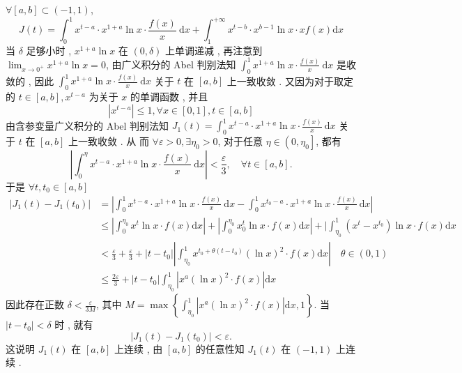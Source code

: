\documentclass[10pt]{article}
\begin{document}
$\forall[a, b] \subset(-1,1)$,
$$
J(t)=\int_{0}^{1} x^{t-a} \cdot x^{1+a} \ln x \cdot \frac{f(x)}{x} \mathrm{~d} x+\int_{1}^{+\infty} x^{t-b} \cdot x^{b-1} \ln x \cdot x f(x) \mathrm{d} x
$$
 当  $\delta$  足够小时 , $x^{1+a} \ln x$  在  $(0, \delta)$  上单调递减 ,  再注意到  $\lim _{x \rightarrow 0^{+}} x^{1+a} \ln x=0$,  由广义积分的  Abel  判别法知  $\int_{0}^{1} x^{1+a} \ln x \cdot \frac{f(x)}{x} \mathrm{~d} x$  是收敛的 ,  因此  $\int_{0}^{1} x^{1+a} \ln x \cdot \frac{f(x)}{x} \mathrm{~d} x$  关于  $t$  在  $[a, b]$  上一致收敛 .  又因为对于取定   的  $t \in[a, b], x^{t-a}$  为关于  $x$  的单调函数 ,  并且 
$$
\left|x^{t-a}\right| \leqslant 1, \forall x \in[0,1], t \in[a, b]
$$
 由含参变量广义积分的  Abel  判别法知  $J_{1}(t)=\int_{0}^{1} x^{t-a} \cdot x^{1+a} \ln x \cdot \frac{f(x)}{x} \mathrm{~d} x$  关于  $t$  在  $[a, b]$  上一致收敛 .  从   而  $\forall \varepsilon>0, \exists \eta_{0}>0$,  对于任意  $\eta \in\left(0, \eta_{0}\right]$,  都有 
$$
\left|\int_{0}^{\eta} x^{t-a} \cdot x^{1+a} \ln x \cdot \frac{f(x)}{x} \mathrm{~d} x\right|<\frac{\varepsilon}{3}, \quad \forall t \in[a, b] .
$$
 于是  $\forall t, t_{0} \in[a, b]$
$$
\begin{aligned}
\left|J_{1}(t)-J_{1}\left(t_{0}\right)\right| &=\left|\int_{0}^{1} x^{t-a} \cdot x^{1+a} \ln x \cdot \frac{f(x)}{x} \mathrm{~d} x-\int_{0}^{1} x^{t_{0}-a} \cdot x^{1+a} \ln x \cdot \frac{f(x)}{x} \mathrm{~d} x\right| \\
& \leqslant\left|\int_{0}^{\eta_{0}} x^{t} \ln x \cdot f(x) \mathrm{d} x\right|+\left|\int_{0}^{\eta_{0}} x_{0}^{t} \ln x \cdot f(x) \mathrm{d} x\right|+\mid \int_{\eta_{0}}^{1}\left(x^{t}-x^{t_{0}}\right) \ln x \cdot f(x) \mathrm{d} x \\
&<\frac{\varepsilon}{3}+\frac{\varepsilon}{3}+\left|t-t_{0}\right|\left|\int_{\eta_{0}}^{1} x^{t_{0}+\theta\left(t-t_{0}\right)}(\ln x)^{2} \cdot f(x) \mathrm{d} x\right| \quad \theta \in(0,1) \\
& \leqslant \frac{2 \varepsilon}{3}+\left|t-t_{0}\right| \int_{\eta_{0}}^{1}\left|x^{a}(\ln x)^{2} \cdot f(x)\right| \mathrm{d} x
\end{aligned}
$$
 因此存在正数  $\delta<\frac{\varepsilon}{3 M}$,  其中  $M=\max \left\{\int_{\eta_{0}}^{1}\left|x^{a}(\ln x)^{2} \cdot f(x)\right| \mathrm{d} x, 1\right\}$.  当  $\left|t-t_{0}\right|<\delta$  时 ,  就有 
$$
\left|J_{1}(t)-J_{1}\left(t_{0}\right)\right|<\varepsilon .
$$
 这说明  $J_{1}(t)$  在  $[a, b]$  上连续 ,  由  $[a, b]$  的任意性知  $J_{1}(t)$  在  $(-1,1)$  上连续 .
\end{document}
